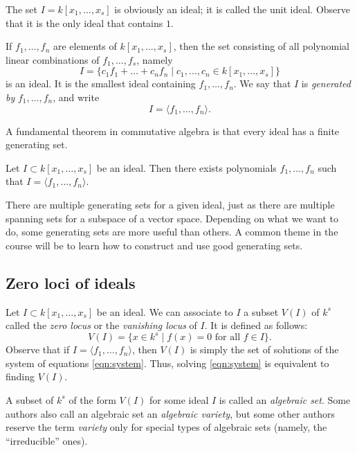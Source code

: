 \documentclass[11pt]{article}
\begin{document}
\begin{example}
  The set $I = k[x_1,\dots,x_s]$ is obviously an ideal; it is called the unit ideal.
  Observe that it is the only ideal that contains $1$.
\end{example}

\begin{example}
  If $f_1, \dots, f_n$ are elements of $k[x_1, \dots, x_s]$, then the set consisting of all polynomial linear combinations of $f_1, \dots, f_s$, namely
  \[ I = \{c_1f_1 + \dots + c_nf_n \mid c_1, \dots, c_n \in k[x_1,\dots,x_s]\}\]
  is an ideal.
  It is the smallest ideal containing $f_1, \dots, f_n$.
  We say that $I$ is \emph{generated by} $f_1, \dots, f_n$, and write
  \[ I = \langle  f_1, \dots, f_n \rangle.\]
\end{example}

A fundamental theorem in commutative algebra is that every ideal has a finite generating set.
\begin{theorem}
  Let $I \subset k[x_1, \dots, x_s]$ be an ideal.
  Then there exists polynomials $f_1, \dots, f_n$ such that $I = \langle  f_1, \dots, f_n \rangle$.
\end{theorem}
There are multiple generating sets for a given ideal, just as there are multiple spanning sets for a subspace of a vector space.
Depending on what we want to do, some generating sets are more useful than others.
A common theme in the course will be to learn how to construct and use good generating sets.

\subsection{Zero loci of ideals}
Let $I \subset k[x_1, \dots, x_s]$ be an ideal.
We can associate to $I$ a subset $V(I)$ of $k^s$ called the \emph{zero locus} or the \emph{vanishing locus} of $I$.
It is defined as follows:
\[
  V(I) = \{x \in k^s \mid f(x) = 0 \text{ for all $f \in I$}\}.
\]
Observe that if $I = \langle  f_1, \dots, f_n \rangle$, then $V(I)$ is simply the set of solutions of the system of equations \eqref{eqn:system}.
Thus, solving \eqref{eqn:system} is equivalent to finding $V(I)$.

A subset of $k^s$ of the form $V(I)$ for some ideal $I$ is called an \emph{algebraic set}.
Some authors also call an algebraic set an \emph{algebraic variety}, but some other authors reserve the term \emph{variety} only for special types of algebraic sets (namely, the ``irreducible'' ones).
\end{document}
